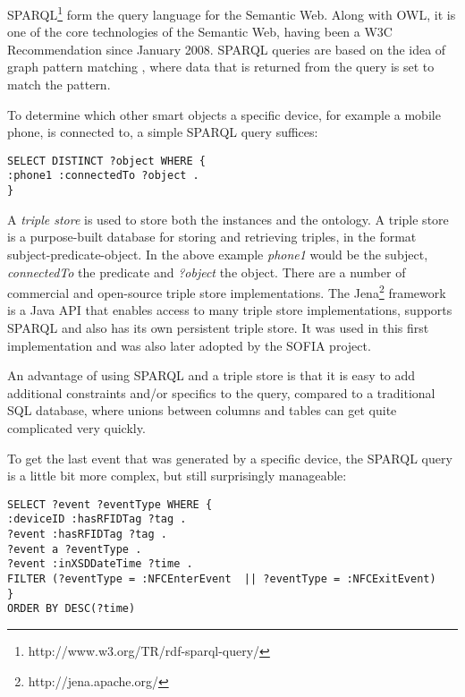 \ac{SPARQL}\footnote{http://www.w3.org/TR/rdf-sparql-query/} form the query language for the Semantic Web. Along with \ac{OWL}, it is one of the core technologies of the Semantic Web, having been a W3C Recommendation since January 2008. \ac{SPARQL} queries are based on the idea of graph pattern matching \cite{Sequeda2012}, where data that is returned from the query is set to match the pattern.

To determine which other smart objects a specific device, for example a mobile phone, is connected to, a simple \ac{SPARQL} query suffices:

\begin{verbatim}
SELECT DISTINCT ?object WHERE {
:phone1 :connectedTo ?object .
}
\end{verbatim}

\label{Jena}
A \emph{triple store} is used to store both the instances and the ontology. A triple store is a purpose-built database for storing and retrieving triples, in the format subject-predicate-object. In the above example \emph{phone1} would be the subject, \emph{connectedTo} the predicate and \emph{?object} the object. There are a number of commercial and open-source triple store implementations. The Jena\footnote{http://jena.apache.org/} framework is a Java \ac{API} that enables access to many triple store implementations, supports \ac{SPARQL} and also has its own persistent triple store. It was used in this first implementation and was also later adopted by the \ac{SOFIA} project.

An advantage of using \ac{SPARQL} and a triple store is that it is easy to add additional constraints and/or specifics to the query, compared to a traditional \ac{SQL} database, where unions between columns and tables can get quite complicated very quickly.

To get the last event that was generated by a specific device, the \ac{SPARQL} query is a little bit more complex, but still surprisingly manageable:

\begin{verbatim}
SELECT ?event ?eventType WHERE { 
:deviceID :hasRFIDTag ?tag . 
?event :hasRFIDTag ?tag .
?event a ?eventType . 
?event :inXSDDateTime ?time . 
FILTER (?eventType = :NFCEnterEvent  || ?eventType = :NFCExitEvent) 
} 
ORDER BY DESC(?time) 
\end{verbatim}

